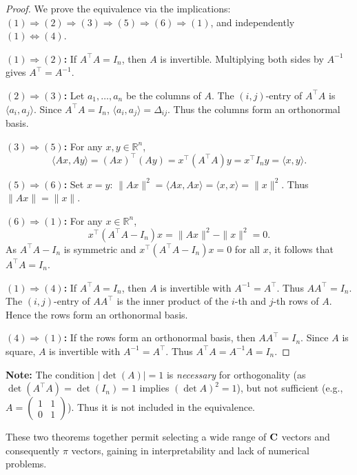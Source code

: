 \begin{proof}
We prove the equivalence via the implications: \\
$(1) \Rightarrow (2) \Rightarrow (3) \Rightarrow (5) \Rightarrow (6) \Rightarrow (1)$, and independently $(1) \Leftrightarrow (4)$.

\textbf{$(1) \Rightarrow (2)$:} If $A^\top A = I_n$, then $A$ is invertible. Multiplying both sides by $A^{-1}$ gives $A^\top = A^{-1}$.

\textbf{$(2) \Rightarrow (3)$:} Let $a_1, \dots, a_n$ be the columns of $A$. The $(i,j)$-entry of $A^\top A$ is $\langle a_i, a_j \rangle$. Since $A^\top A = I_n$, $\langle a_i, a_j \rangle = \Delta_{ij}$. Thus the columns form an orthonormal basis.

\textbf{$(3) \Rightarrow (5)$:} For any $x, y \in \mathbb{R}^n$,
\[
\langle Ax, Ay \rangle = (Ax)^\top (Ay) = x^\top (A^\top A) y = x^\top I_n y = \langle x, y \rangle.
\]

\textbf{$(5) \Rightarrow (6)$:} Set $x = y$: $\|Ax\|^2 = \langle Ax, Ax \rangle = \langle x, x \rangle = \|x\|^2$. Thus $\|Ax\| = \|x\|$.

\textbf{$(6) \Rightarrow (1)$:} For any $x \in \mathbb{R}^n$,
\[
x^\top (A^\top A - I_n) x = \|Ax\|^2 - \|x\|^2 = 0.
\]
As $A^\top A - I_n$ is symmetric and $x^\top (A^\top A - I_n) x = 0$ for all $x$, it follows that $A^\top A = I_n$.

\textbf{$(1) \Rightarrow (4)$:} If $A^\top A = I_n$, then $A$ is invertible with $A^{-1} = A^\top$. Thus $A A^\top = I_n$. The $(i,j)$-entry of $A A^\top$ is the inner product of the $i$-th and $j$-th rows of $A$. Hence the rows form an orthonormal basis.

\textbf{$(4) \Rightarrow (1)$:} If the rows form an orthonormal basis, then $A A^\top = I_n$. Since $A$ is square, $A$ is invertible with $A^{-1} = A^\top$. Thus $A^\top A = A^{-1} A = I_n$.
\end{proof}

\textbf{Note:} The condition $|\det(A)| = 1$ is \textit{necessary} for orthogonality (as $\det(A^\top A) = \det(I_n) = 1$ implies $(\det A)^2 = 1$), but not sufficient (e.g., $A = \begin{pmatrix} 1 & 1 \\ 0 & 1 \end{pmatrix}$). Thus it is not included in the equivalence.

These two theorems together permit selecting a wide range of ${\bf C}$ vectors and consequently ${\pi}$ vectors, gaining in interpretability and lack of numerical problems.

